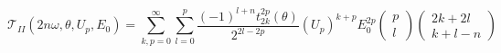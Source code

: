 \begin{equation}
\mathcal{T}_{II}(2n\omega ,\theta ,U_{p},E_{0})=\sum_{k,p=0}^{\infty
}\sum_{l=0}^{p}\frac{(-1)^{l+n} t_{2k}^{2p}(\theta )}{2^{2l-2p}}\left(
U_{p}\right) ^{k+p}E_{0}^{2p}\left( 
\begin{array}{c}
p \\ 
l%
\end{array}
\right) \left( 
\begin{array}{c}
2k+2l \\ 
k+l-n%
\end{array}
\right)  \label{II1}
\end{equation}

